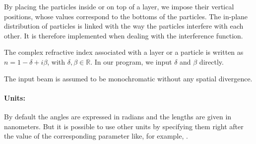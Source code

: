 By placing the particles
inside or on top of a layer, we impose their vertical positions, whose
values correspond to the bottoms of the particles. The in-plane distribution of particles is linked with the way the
particles interfere with each other. It is therefore implemented
when dealing with the interference function.


The complex refractive index associated with a layer or a particle is written as $n=1-\delta +i\beta$, with
$\delta, \beta \in \mathbb{R}$. In our program, we input $\delta$ and
$\beta$ directly.


\noindent The input beam is assumed to be monochromatic without any
spatial divergence.\\ %

\paragraph{Units:} 

By default the angles are expressed in radians and the lengths are given in
nanometers.  But it is possible to use other units by
specifying them right after the value of the corresponding
parameter like, for example, .




